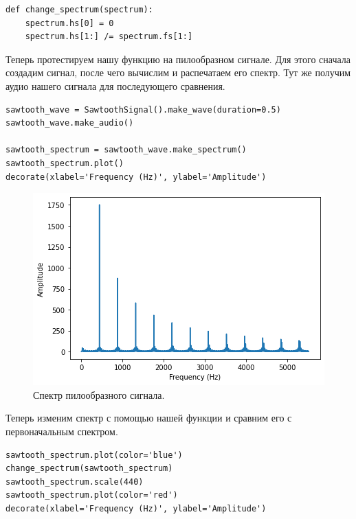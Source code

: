 \documentclass[a4paper, 14pt]{extarticle}
\begin{document}
    \begin{lstlisting}[caption= {Функция, изменяющая спектр.}, label={lst:task5_function}]
def change_spectrum(spectrum):
    spectrum.hs[0] = 0
    spectrum.hs[1:] /= spectrum.fs[1:]
    \end{lstlisting}

    Теперь протестируем нашу функцию на пилообразном сигнале. Для этого сначала создадим сигнал, после чего вычислим и распечатаем его спектр.
    Тут же получим аудио нашего сигнала для последующего сравнения.

    \begin{lstlisting}[caption= Создание пилообразного сигнала и получение его спектра., label={lst:task5_spectrum}]
sawtooth_wave = SawtoothSignal().make_wave(duration=0.5)
sawtooth_wave.make_audio()

sawtooth_spectrum = sawtooth_wave.make_spectrum()
sawtooth_spectrum.plot()
decorate(xlabel='Frequency (Hz)', ylabel='Amplitude')
    \end{lstlisting}

    \begin{figure}[H]
        \centering
        \includegraphics[width=0.7\linewidth]{resources/Images/task5_spectrum}
        \caption{Спектр пилообразного сигнала.}
        \label{fig:task5_spectrum}
    \end{figure}

    Теперь изменим спектр с помощью нашей функции и сравним его с первоначальным спектром.

    \begin{lstlisting}[caption= Изменение спектра и его сравнине с первоначальным спектром., label={lst:task5_compare_spectrum}]
sawtooth_spectrum.plot(color='blue')
change_spectrum(sawtooth_spectrum)
sawtooth_spectrum.scale(440)
sawtooth_spectrum.plot(color='red')
decorate(xlabel='Frequency (Hz)', ylabel='Amplitude')
    \end{lstlisting}
\end{document}
